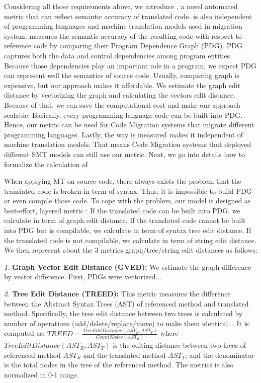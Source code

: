 Considering all those requirements above, we introduce {\model}, a novel automated metric that can reflect semantic accuracy of translated code. {\model} is also independent of programming languages and machine translation models used in migration system. {\model} measures the semantic accuracy of the resulting code with respect to reference code by comparing their Program Dependence Graph (PDG). PDG captures both the data and control dependencies among program entities. Because those dependencies play an important role in a program, we expect PDG can represent well the semantics of source code. Usually, comparing graph is expensive, but our approach makes it affordable. We estimate the graph edit distance by vectorizing the graph and calculating the vectors edit distance. Because of that, we can save the computational cost and make our approach scalable. Basically, every programming language code can be built into PDG. Hence, our metric can be used for Code Migration systems that migrate different programming languages. Lastly, the way {\model} is measured makes it independent of machine translation models. That means Code Migration systems that deployed different SMT models can still use our metric. Next, we go into details how to formalize the calculation of {\model}


When applying MT on source code, there always exists the problem that the translated code is broken in term of syntax. Thus, it is impossible to build PDG or even compile those code. To cope with the problem, our model is designed as best-effort, layered metric  : If the translated code can be built into PDG, we calculate {\model} in term of graph edit distance. If the translated code cannot be built into PDG but is compilable, we calculate {\model} in term of syntax tree edit distance. If the translated code is not compilable, we calculate {\model} in term of string edit distance. We then represent about the 3 metrics graph/tree/string edit distances as follows:

\emph{1.} \textbf{Graph Vector Edit Distance (GVED):} We estimate the graph difference by vector difference. First, PDGs were vectorized...

\emph{2.} \textbf{Tree Edit Distance (TREED):} This metric measures the difference between the Abstract Syntax Trees (AST) of referenced method and translated method. Specifically, the tree edit distance between two trees is calculated by number of operations (add/delete/replace/move) to make them identical. \cite{algorithm}. 
It is computed as:  $TREED = \frac{TreeEditDistance\left(AST_R, AST_T\right)}{CountNodes \left(AST_R\right)}$ where $TreeEditDistance\left(AST_R, AST_T\right)$ is the editing distance between two trees of referenced method $AST_R$ and the translated method $AST_T$; and the denominator is the total nodes in the tree of the referenced method.  The metrics is also normalized in 0-1 range.

